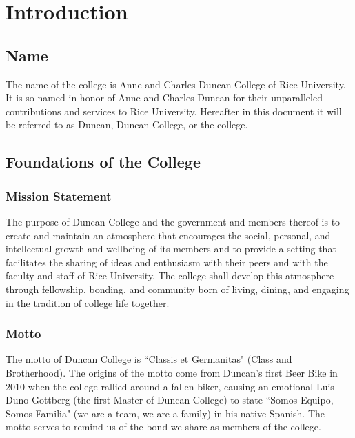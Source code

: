 \documentclass[USletter,12pt]{article}
\begin{document}





{\small \tableofcontents}



\newpage


\section{Introduction}



\subsection{Name}


The name of the college is Anne and Charles Duncan College of Rice University.  It is so named in honor of Anne and Charles Duncan for their unparalleled contributions and services to Rice University.  Hereafter in this document it will be referred to as Duncan, Duncan College, or the college.


\subsection{Foundations of the College}


\subsubsection{Mission Statement}
The purpose of Duncan College and the government and members thereof is to create and maintain an atmosphere that encourages the social, personal, and intellectual growth and wellbeing of its members and to provide a setting that facilitates the sharing of ideas and enthusiasm with their peers and with the faculty and staff of Rice University.  The college shall develop this atmosphere through fellowship, bonding, and community born of living, dining, and engaging in the tradition of college life together.

\subsubsection{Motto}
The motto of Duncan College is ``Classis et Germanitas" (Class and Brotherhood).  The origins of the motto come from Duncan's first Beer Bike in 2010 when the college rallied around a fallen biker, causing an emotional Luis Duno-Gottberg (the first Master of Duncan College) to state ``Somos Equipo, Somos Familia" (we are a team, we are a family) in his native Spanish.  The motto serves to remind us of the bond we share as members of the college.
\end{document}
